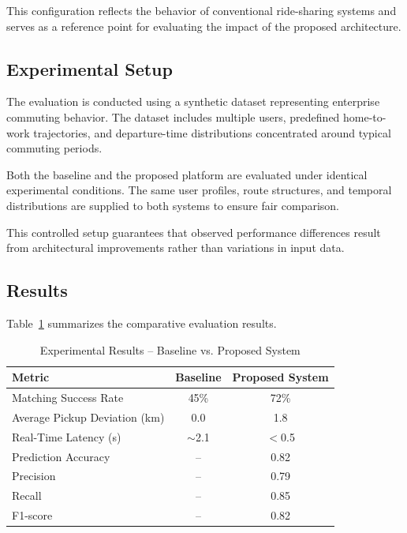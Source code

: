 This configuration reflects the behavior of conventional ride-sharing systems and serves as a reference point for evaluating the impact of the proposed architecture.


\subsection{Experimental Setup}

The evaluation is conducted using a synthetic dataset representing enterprise commuting behavior. The dataset includes multiple users, predefined home-to-work trajectories, and departure-time distributions concentrated around typical commuting periods.

Both the baseline and the proposed platform are evaluated under identical experimental conditions. The same user profiles, route structures, and temporal distributions are supplied to both systems to ensure fair comparison.

This controlled setup guarantees that observed performance differences result from architectural improvements rather than variations in input data.


\subsection{Results}

Table~\ref{tab:experimental_results} summarizes the comparative evaluation results.

\begin{table}[H]
\centering
\renewcommand{\arraystretch}{1.3}

\begin{tabular}{|l|c|c|}
\hline
\textbf{Metric} & \textbf{Baseline} & \textbf{Proposed System} \\
\hline
Matching Success Rate & 45\% & 72\% \\
\hline
Average Pickup Deviation (km) & 0.0 & 1.8 \\
\hline
Real-Time Latency (s) & $\sim$2.1 & $<$0.5 \\
\hline
Prediction Accuracy & -- & 0.82 \\
\hline
Precision & -- & 0.79 \\
\hline
Recall & -- & 0.85 \\
\hline
F1-score & -- & 0.82 \\
\hline
\end{tabular}

\caption{Experimental Results -- Baseline vs. Proposed System}
\label{tab:experimental_results}

\end{table}

